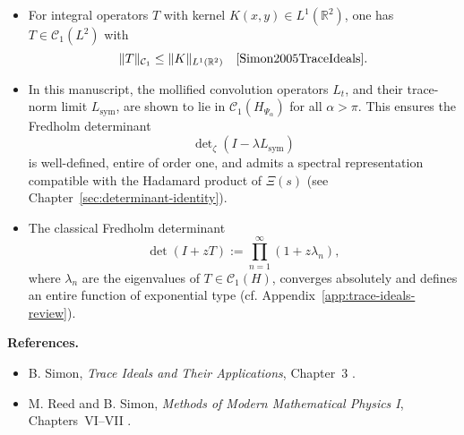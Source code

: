 \begin{definition}
\begin{itemize}
    \item For integral operators \( T \) with kernel \( K(x,y) \in L^1(\mathbb{R}^2) \), one has \( T \in \mathcal{C}_1(L^2) \) with
    \[
    \| T \|_{\mathcal{C}_1} \le \|K\|_{L^1(\mathbb{R}^2)} \quad \text{\cite[Thm.~4.2]{Simon2005TraceIdeals}}.
    \]

    \item In this manuscript, the mollified convolution operators \( L_t \), and their trace-norm limit \( L_{\mathrm{sym}} \), are shown to lie in \( \mathcal{C}_1(H_{\Psi_\alpha}) \) for all \( \alpha > \pi \). This ensures the Fredholm determinant
    \[
    \det\nolimits_{\zeta}(I - \lambda L_{\mathrm{sym}})
    \]
    is well-defined, entire of order one, and admits a spectral representation compatible with the Hadamard product of \( \Xi(s) \) (see Chapter~\ref{sec:determinant-identity}).

    \item The classical Fredholm determinant
    \[
    \det(I + zT) := \prod_{n=1}^\infty (1 + z \lambda_n),
    \]
    where \( \lambda_n \) are the eigenvalues of \( T \in \mathcal{C}_1(H) \), converges absolutely and defines an entire function of exponential type (cf. Appendix~\ref{app:trace-ideals-review}).
\end{itemize}

\medskip
\noindent\textbf{References.}
\begin{itemize}
    \item B. Simon, \emph{Trace Ideals and Their Applications}, Chapter~3 \cite{Simon2005TraceIdeals}.
    \item M. Reed and B. Simon, \emph{Methods of Modern Mathematical Physics I}, Chapters~VI–VII \cite{ReedSimon1980I}.
\end{itemize}
\end{definition}
